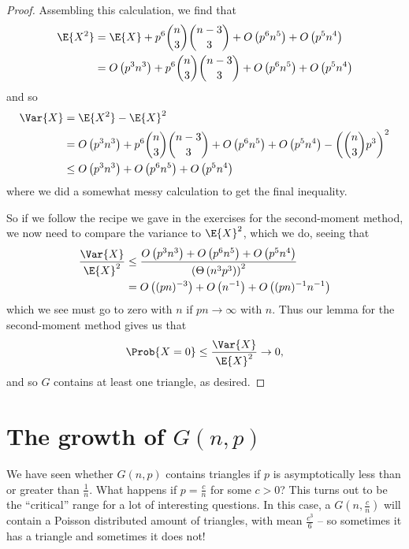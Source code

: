 \documentclass[nobib]{tufte-handout}
\begin{document}
\begin{proposition}
\begin{proof}
    Assembling this calculation, we find that
    \begin{align*}
      \E{X^2} &= \E{X} + p^6\binom{n}{3}\binom{n-3}{3} + O\left(p^6 n^5\right) + O\left(p^5 n^4\right)\\
      &= O\left(p^3 n^3\right) + p^6\binom{n}{3}\binom{n-3}{3} + O\left(p^6 n^5\right) + O\left(p^5 n^4\right)
    \end{align*}
    and so
    \begin{align*}
      \Var{X} &= \E{X^2} - \E{X}^2\\
      &= O\left(p^3 n^3\right) + p^6\binom{n}{3}\binom{n-3}{3} + O\left(p^6 n^5\right) + O\left(p^5 n^4\right) - \left(\binom{n}{3} p^3\right)^2\\
      &\leq O\left(p^3 n^3\right) + O\left(p^6 n^5\right) + O\left(p^5 n^4\right)
    \end{align*}
    where we did a somewhat messy calculation to get the final inequality.

    So if we follow the recipe we gave in the exercises for the second-moment method, we now need to compare the variance to $\E{X}^2$, which we do, seeing that
    \begin{align*}
      \frac{\Var{X}}{\E{X}^2} &\leq \frac{O\left(p^3 n^3\right) + O\left(p^6 n^5\right) + O\left(p^5 n^4\right)}{\left(\Theta\left(n^3 p^3\right)\right)^2}\\
      &= O\left((pn)^{-3}\right) + O\left(n^{-1}\right) + O\left((pn)^{-1}n^{-1}\right)
    \end{align*}
    which we see must go to zero with $n$ if $pn \to \infty$ with $n$. Thus our lemma for the second-moment method gives us that
    $$\Prob{X = 0} \leq \frac{\Var{X}}{\E{X}^2} \to 0,$$
    and so $G$ contains at least one triangle, as desired.
  \end{proof}
\end{proposition}

\section{The growth of $G(n,p)$}

We have seen whether $G(n,p)$ contains triangles if $p$ is asymptotically less than or greater than $\frac{1}{n}$. What happens if $p = \frac{c}{n}$ for some $c>0$? This turns out to be the ``critical'' range for a lot of interesting questions. In this case, a $G\left(n, \frac{c}{n}\right)$ will contain a Poisson distributed amount of triangles, with mean $\frac{c^3}{6}$ -- so sometimes it has a triangle and sometimes it does not!
\end{document}
